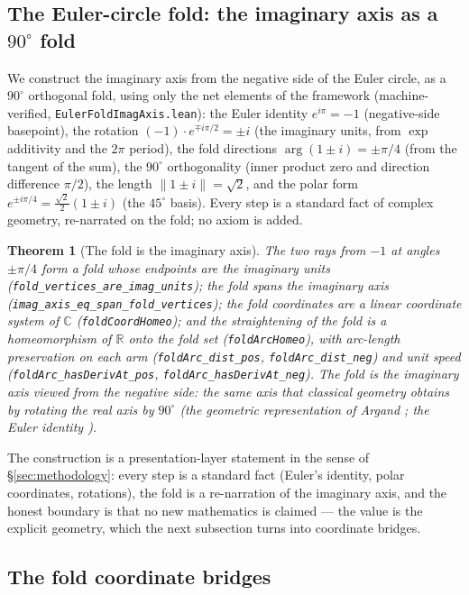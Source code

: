 \documentclass{article}
\newtheorem{theorem}{Theorem}[section]
\begin{document}
\subsection{The Euler-circle fold: the imaginary axis as a $90^\circ$ fold}
\label{sec:partIV:fold}

We construct the imaginary axis from the negative side of the Euler
circle, as a $90^\circ$ orthogonal fold, using only the net elements
of the framework (machine-verified, \texttt{EulerFoldImagAxis.lean}):
the Euler identity $e^{i\pi}=-1$ (negative-side basepoint), the
rotation $(-1)\cdot e^{\mp i\pi/2}=\pm i$ (the imaginary units, from
$\exp$ additivity and the $2\pi$ period), the fold directions
$\arg(1\pm i)=\pm\pi/4$ (from the tangent of the sum), the $90^\circ$
orthogonality (inner product zero and direction difference $\pi/2$),
the length $\|1\pm i\|=\sqrt2$, and the polar form
$e^{\pm i\pi/4}=\frac{\sqrt2}{2}(1\pm i)$ (the $45^\circ$ basis).
Every step is a standard fact of complex geometry, re-narrated on the
fold; no axiom is added.

\begin{theorem}[The fold is the imaginary axis]
\label{thm:fold_imag_axis}
The two rays from $-1$ at angles $\pm\pi/4$ form a fold whose endpoints
are the imaginary units (\texttt{fold\_vertices\_are\_imag\_units});
the fold spans the imaginary axis
(\texttt{imag\_axis\_eq\_span\_fold\_vertices}); the fold coordinates
are a linear coordinate system of $\mathbb C$
(\texttt{foldCoordHomeo}); and the straightening of the fold is a
homeomorphism of $\mathbb R$ onto the fold set
(\texttt{foldArcHomeo}), with arc-length preservation on each arm
(\texttt{foldArc\_dist\_pos}, \texttt{foldArc\_dist\_neg}) and unit
speed (\texttt{foldArc\_hasDerivAt\_pos},
\texttt{foldArc\_hasDerivAt\_neg}). The fold is the imaginary axis
viewed from the negative side: the same axis that classical geometry
obtains by rotating the real axis by $90^\circ$ (the geometric
representation of Argand \cite{argand1806}; the Euler identity
\cite{euler1748}).
\end{theorem}

The construction is a presentation-layer statement in the sense of
\S\ref{sec:methodology}: every step is a standard fact (Euler's
identity, polar coordinates, rotations), the fold is a re-narration of
the imaginary axis, and the honest boundary is that no new mathematics
is claimed --- the value is the explicit geometry, which the next
subsection turns into coordinate bridges.

\subsection{The fold coordinate bridges}
\label{sec:partIV:bridges}
\end{document}
